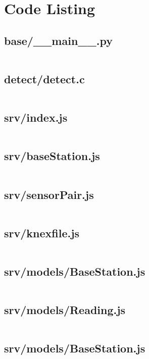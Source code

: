 \chapter{Code Listing}

\section{base/\_\_main\_\_.py}
\inputminted{python}{../base/__main__.py}

\section{detect/detect.c}
\inputminted{C}{../detect/detect.c}


\section{srv/index.js}
\inputminted{javascript}{../srv/index.js}

\section{srv/baseStation.js}
\inputminted{javascript}{../srv/baseStation.js}

\section{srv/sensorPair.js}
\inputminted{javascript}{../srv/sensorPair.js}

\section{srv/knexfile.js}
\inputminted{javascript}{../srv/knexfile.js}

\section{srv/models/BaseStation.js}
\inputminted{javascript}{../srv/models/BaseStation.js}

\section{srv/models/Reading.js}
\inputminted{javascript}{../srv/models/Reading.js}

\section{srv/models/BaseStation.js}
\inputminted{javascript}{../srv/models/SensorPair.js}
